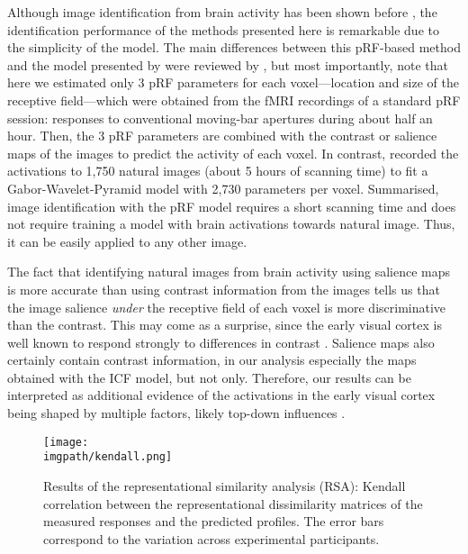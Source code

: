 {Although image identification from brain activity has been shown before \citep{kay2008imageid}, the identification performance of the methods presented here is remarkable due to the simplicity of the model. The main differences between this pRF-based method and the model presented by \citet{kay2008imageid} were reviewed by \citet{zuiderbaan2017imageidentification}, but most importantly, note that here we estimated only 3 pRF parameters for each voxel---location and size of the receptive field---which were obtained from the fMRI recordings of a standard pRF session: responses to conventional moving-bar apertures during about half an hour. Then, the 3 pRF parameters are combined with the contrast or salience maps of the images to predict the activity of each voxel. In contrast, \citet{kay2008imageid} recorded the activations to 1,750 natural images (about 5 hours of scanning time) to fit a Gabor-Wavelet-Pyramid model with 2,730 parameters per voxel. Summarised, image identification with the pRF model requires a short scanning time and does not require training a model with brain activations towards natural image. Thus, it can be easily applied to any other image.

The fact that identifying natural images from brain activity using salience maps is more accurate than using contrast information from the images tells us that the image salience \textit{under} the receptive field of each voxel is more discriminative than the contrast. This may come as a surprise, since the early visual cortex is well known to respond strongly to differences in contrast \citep{boynton1999contrast, olman2004contrast}. Salience maps also certainly contain contrast information, in our analysis especially the maps obtained with the ICF model, but not only. Therefore, our results can be interpreted as additional evidence of the activations in the early visual cortex being shaped by multiple factors, likely top-down influences \citep{treue2003salience}.

\begin{figure}[htb]
  \begin{center}
    \texttt{[image: \\imgpath/kendall.png]}
  \end{center}
  \caption{Results of the representational similarity analysis (RSA): Kendall correlation between the representational dissimilarity matrices of the measured responses and the predicted profiles. The error bars correspond to the variation across experimental participants.}
\label{fig:imageid-kendall}
\end{figure}

}
